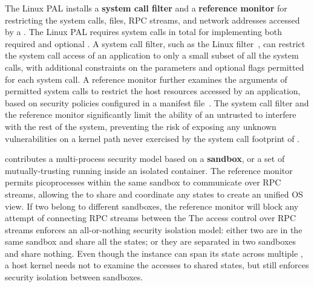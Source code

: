 The Linux PAL installs a {\bf system call filter} and a {\bf reference monitor}
for restricting the system calls, files, RPC streams, and network addresses
accessed by a \picoproc{}.
The Linux PAL requires \hostsyscallnum{} system calls in total
for implementing both required and optional \hostapis{}.
A system call filter, such as the Linux \seccomp{} filter~\cite{seccomp},
can restrict the system call access of an application
to only a small subset of all the system calls, with additional constraints on the parameters and optional flags permitted for each system call.
A reference monitor further examines the arguments of permitted system calls to restrict the host resources accessed by an application, based on security policies configured in a manifest file~\cite{hunt07rethink}.
The system call filter and the reference monitor
significantly limit the ability of an untrusted \graphene{} \picoproc{} to interfere with the rest of the system,
preventing the risk of exposing any unknown vulnerabilities
on a kernel path never exercised by the system call footprint of \graphene{}.



\graphene{} contributes a multi-process security model 
based on a {\bf sandbox},
or a set of mutually-trusting \picoprocs{} running inside an isolated container.
The reference monitor permits picoprocesses within the same sandbox
to communicate over RPC streams,
allowing the \libos{} to share and coordinate any states
to create an unified OS view.
If two \picoprocs{} belong to different sandboxes,
the reference monitor will block any attempt of connecting RPC streams
between the \picoprocs{}
The access control over RPC streams
enforces an all-or-nothing security isolation model:
either two \picoprocs{} are in the same sandbox and share all the \libos{} states; or they are separated in two sandboxes and share nothing.
Even though the \libos{} instance can span its state across multiple \picoprocs{},
a host kernel needs not to examine the accesses to shared \libos{} states, but still enforces security isolation between sandboxes.




